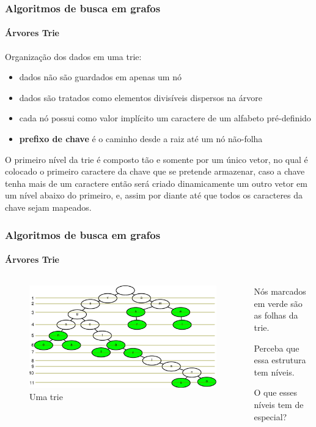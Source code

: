 \begin{frame}
	\frametitle{Algoritmos de busca em grafos}
	\framesubtitle{Árvores Trie}
	\par Organização dos dados em uma trie:
	\begin{itemize}
		\item dados não são guardados em apenas um nó
		\item dados são tratados como elementos divisíveis dispersos na árvore
		\item cada nó possui como valor implícito um caractere de um alfabeto pré-definido
		\item \textbf{prefixo de chave} é o caminho desde a raiz até um nó não-folha
	\end{itemize}
	\par O primeiro nível da trie é composto tão e somente por um único vetor, no qual é	colocado o primeiro caractere da chave que se pretende armazenar, caso a chave tenha mais de um caractere então será criado dinamicamente um outro vetor em um nível abaixo do primeiro, e, assim por diante até que todos os caracteres da chave	sejam mapeados.
\end{frame}

\begin{frame}
	\frametitle{Algoritmos de busca em grafos}
	\framesubtitle{Árvores Trie}
	\begin{columns}
		\begin{column}{0.7\textwidth}
			\begin{figure}
				\centering
				\includegraphics[width=\linewidth]{images/trie}
				\caption{Uma trie}
				\label{fig:trie}
			\end{figure}
		\end{column}
		\begin{column}{0.3\textwidth}
			\par Nós marcados em verde são as folhas da trie.
			\par Perceba que essa estrutura tem níveis.
			\par O que esses níveis tem de especial?
		\end{column}
	\end{columns}
\end{frame}

